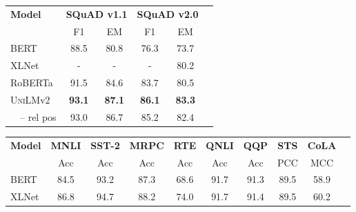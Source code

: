 \documentclass{article}
\newcommand{\bert}{BERT}
\newcommand{\xlnet}{XLNet}
\newcommand{\roberta}{RoBERTa}
\newcommand{\unilmvtwo}{\textsc{UniLM}v2}
\newcommand\norelpos{-- rel pos}
\begin{document}
\begin{table*}[t]
\centering
\begin{minipage}{2.48in}
\centering
\begin{tabular}{@{\hskip1pt}l @{\hskip2pt} @{\hskip2pt}c@{\hskip2pt} @{\hskip2pt}c@{ \hskip2pt} @{\hskip2pt}c@{\hskip2pt} @{\hskip2pt}c@{\hskip2pt} @{\hskip2pt}c@{\hskip1pt}}
\toprule
\multirow{2}{*}{\bf Model} & \multicolumn{2}{l}{\bf SQuAD v1.1} &\multicolumn{2}{l}{\bf SQuAD v2.0} \\
& F1 & EM & F1 & EM  \\
\midrule
\bert{} & 88.5 & 80.8 & 76.3 & 73.7 \\
\xlnet{} & - & - & - & 80.2 \\
\roberta{} & 91.5 & 84.6 & 83.7 & 80.5 \\
\unilmvtwo{} & \textbf{93.1} & \textbf{87.1} & \textbf{86.1} & \textbf{83.3} \\
~~\norelpos{} & {93.0} & {86.7} & {85.2} & {82.4} \\
\bottomrule
\end{tabular}
\caption{
Results of \textsc{base}-size pre-trained models on the SQuAD v1.1/v2.0 development sets.
We report F1 and exact match (EM) scores.
Results of \unilmvtwo{} are averaged over five runs.
``\norelpos{}'' is the model without relative position bias.
}
\label{tbl:squad:base}
\end{minipage}
\hfill
\begin{minipage}{4.2in}
\centering
\begin{tabular}{@{\hskip1pt}l@{\hskip2pt} @{\hskip2pt}c@{\hskip3pt} @{\hskip3pt}c@{ \hskip2pt} @{\hskip2pt}c@{\hskip4pt} @{\hskip4pt}c@{\hskip4pt} @{\hskip4pt}c@{\hskip4pt} @{\hskip4pt}c@{\hskip4pt} @{\hskip4pt}c @{\hskip4pt} @{\hskip4pt} c@{\hskip4pt}  @{\hskip4pt} c@{\hskip1pt}}
\toprule
\multirow{2}{*}{\bf Model} & \textbf{MNLI} & \textbf{SST-2} & \textbf{MRPC} & \textbf{RTE}  & \textbf{QNLI} & \textbf{QQP}  & \textbf{STS}  & \textbf{CoLA} \\
                          &      Acc      &      Acc       &      Acc      &      Acc      &      Acc      &      Acc      &      PCC      &      MCC      \\ \midrule
\bert{}                    &     84.5      &      93.2      &     87.3      &     68.6      &     91.7      &     91.3      &     89.5      &     58.9      \\
\xlnet{}                   &     86.8      &      94.7      &     88.2      &     74.0      &     91.7      &     91.4      &     89.5      &     60.2      \\

\end{tabular}
\end{minipage}
\end{table*}
\end{document}
